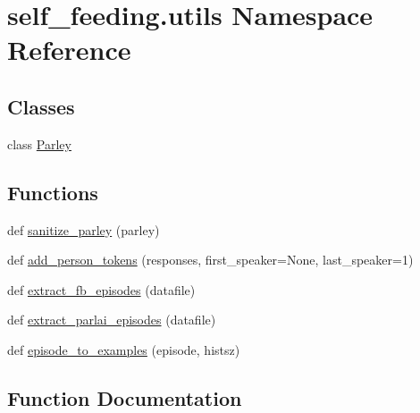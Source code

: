 \hypertarget{namespaceself__feeding_1_1utils}{}\section{self\+\_\+feeding.\+utils Namespace Reference}
\label{namespaceself__feeding_1_1utils}
\subsection*{Classes}
\begin{DoxyCompactItemize}
\item 
class \hyperlink{classself__feeding_1_1utils_1_1Parley}{Parley}
\end{DoxyCompactItemize}
\subsection*{Functions}
\begin{DoxyCompactItemize}
\item 
def \hyperlink{namespaceself__feeding_1_1utils_a6c6383b2b208a5cf7d3d043376411034}{sanitize\+\_\+parley} (parley)
\item 
def \hyperlink{namespaceself__feeding_1_1utils_ab55b6655be64ff265dbccaf4b59ccdfe}{add\+\_\+person\+\_\+tokens} (responses, first\+\_\+speaker=None, last\+\_\+speaker=1)
\item 
def \hyperlink{namespaceself__feeding_1_1utils_a578aab95575fe72eee6768341a257a05}{extract\+\_\+fb\+\_\+episodes} (datafile)
\item 
def \hyperlink{namespaceself__feeding_1_1utils_ab5320af5eed839794f63c16ab25ec8a8}{extract\+\_\+parlai\+\_\+episodes} (datafile)
\item 
def \hyperlink{namespaceself__feeding_1_1utils_a40d25d283be41f59e7167424691b4ba8}{episode\+\_\+to\+\_\+examples} (episode, histsz)
\end{DoxyCompactItemize}


\subsection{Function Documentation}
\mbox{\label{namespaceself__feeding_1_1utils_ab55b6655be64ff265dbccaf4b59ccdfe}} 
